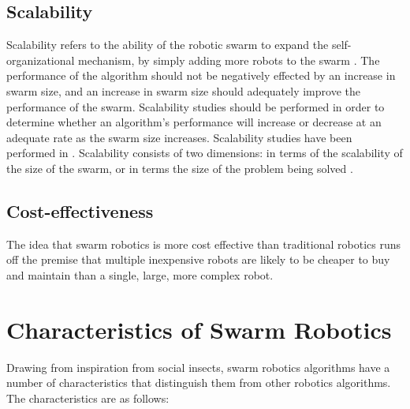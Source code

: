 \subsection{Scalability}
\label{sr:scalabilty}
Scalability refers to the ability of the robotic swarm to expand the self-organizational mechanism, by simply adding more robots to the swarm \cite{brambilla2013swarm}. The performance of the algorithm should not be negatively effected by an increase in swarm size, and an increase in swarm size should adequately improve the performance of the swarm. Scalability studies should be performed in order to determine whether an algorithm's performance will increase or decrease at an adequate rate as the swarm size increases. Scalability studies have been performed in \cite{bahgecci2005evolving,nouyan2008path,zarzhitsky2005distributed}.
Scalability consists of two dimensions: in terms of the scalability of the size of the swarm, or in terms the size of the problem being solved \cite{brambilla2013swarm}.

\subsection{Cost-effectiveness}
The idea that swarm robotics is more cost effective than traditional robotics runs off the premise that multiple inexpensive robots are likely to be cheaper to buy and maintain than a single, large, more complex robot. 

\section{Characteristics of Swarm Robotics}
\label{characteristics}

Drawing from inspiration from social insects, swarm robotics algorithms have a number of characteristics that distinguish them from other robotics algorithms. The characteristics are as follows:

